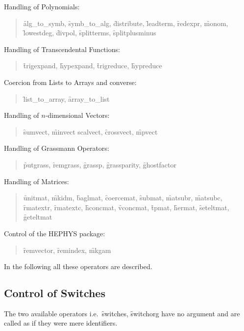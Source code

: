 \begin{itemize}
\begin{quote}
\end{quote}
\item{Handling of Polynomials:}
\begin{quote}\sloppy\raggedright
\f{alg\_to\_symb}, \f{symb\_to\_alg},
\f{distribute}, \f{leadterm}, \f{redexpr}, \f{monom},
\f{lowestdeg}, \f{divpol}, \f{splitterms}, \f{splitplusminus}
\end{quote}
\item{Handling of Transcendental Functions:}
\begin{quote}\sloppy\raggedright
\f{trigexpand}, \f{hypexpand}, \f{trigreduce}, \f{hypreduce}
\end{quote}
\item{Coercion from Lists to Arrays and converse:}
\begin{quote}\sloppy\raggedright
\f{list\_to\_array}, \f{array\_to\_list}
\end{quote}
\item{Handling of $n$-dimensional Vectors:}
\begin{quote}\sloppy\raggedright
\f{sumvect}, \f{minvect scalvect}, \f{crossvect}, \f{mpvect}
\end{quote}
{\item Handling of Grassmann Operators:}
\begin{quote}\sloppy\raggedright
  \f{putgrass}, \f{remgrass}, \f{grassp}, \f{grassparity},
  \f{ghostfactor}
\end{quote}
\item{Handling of Matrices:}
\begin{quote}\sloppy\raggedright
\f{unitmat}, \f{mkidm}, \f{baglmat}, \f{coercemat},
\f{submat}, \f{matsubr}, \f{matsubc}, \f{rmatextr}, \f{rmatextc},
\f{hconcmat}, \f{vconcmat}, \f{tpmat}, \f{hermat},
\f{seteltmat}, \f{geteltmat}
\end{quote}
\item{Control of the HEPHYS package:}
\begin{quote}\sloppy\raggedright
\f{remvector}, \f{remindex}, \f{mkgam}
\end{quote}
\end{itemize}
In the following all these operators are described.
\subsection{Control of Switches}
\hypertarget{operator:SWITCHES}{}
\hypertarget{operator:SWITCHORG}{}
The two available operators i.e.\ \f{switches}, \f{switchorg} have
no argument and are called as if they were mere identifiers.

